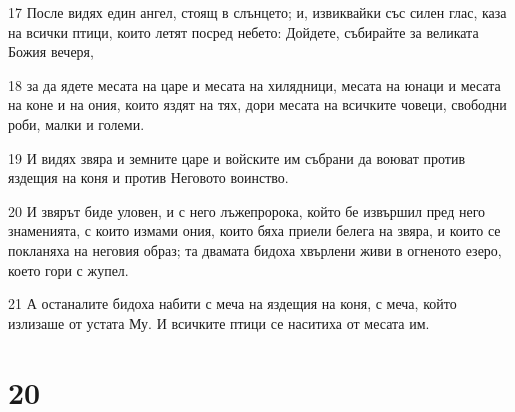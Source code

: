 \par 17 После видях един ангел, стоящ в слънцето; и, извиквайки със силен глас, каза на всички птици, които летят посред небето: Дойдете, събирайте за великата Божия вечеря,
\par 18 за да ядете месата на царе и месата на хилядници, месата на юнаци и месата на коне и на ония, които яздят на тях, дори месата на всичките човеци, свободни роби, малки и големи.
\par 19 И видях звяра и земните царе и войските им събрани да воюват против яздещия на коня и против Неговото воинство.
\par 20 И звярът биде уловен, и с него лъжепророка, който бе извършил пред него знаменията, с които измами ония, които бяха приели белега на звяра, и които се покланяха на неговия образ; та двамата бидоха хвърлени живи в огненото езеро, което гори с жупел.
\par 21 А останалите бидоха набити с меча на яздещия на коня, с меча, който излизаше от устата Му. И всичките птици се наситиха от месата им.

\chapter{20}

